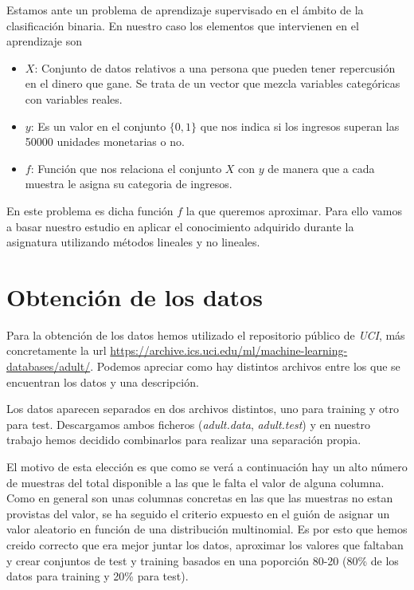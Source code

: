 \documentclass[a4paper,11pt]{article}
\begin{document}
Estamos ante un problema de aprendizaje supervisado en el ámbito de la
clasificación binaria. En nuestro caso los elementos que intervienen en el
aprendizaje son 

\begin{itemize}
    \item $X$: Conjunto de datos relativos a una persona que pueden tener
    repercusión en el dinero que gane. Se trata de un vector que mezcla
    variables categóricas con variables reales.
    \item $y$: Es un valor en el conjunto $\{0,1\}$ que nos indica si los
    ingresos superan las 50000 unidades monetarias o no.
    \item $f$: Función que nos relaciona el conjunto $X$ con $y$ de manera que a
    cada muestra le asigna su categoria de ingresos.
\end{itemize}

En este problema es dicha función $f$ la que queremos aproximar. Para ello vamos
a basar nuestro estudio en aplicar el conocimiento adquirido durante la
asignatura utilizando métodos lineales y no lineales.

\section{Obtención de los datos}

Para la obtención de los datos hemos utilizado el repositorio público de
\textit{UCI}, más concretamente la url
\href{https://archive.ics.uci.edu/ml/machine-learning-databases/adult/}{https://archive.ics.uci.edu/ml/machine-learning-databases/adult/}.
Podemos apreciar como hay distintos archivos entre los que se encuentran los
datos y una descripción. 

Los datos aparecen separados en dos archivos distintos, uno para training y otro
para test. Descargamos ambos ficheros (\textit{adult.data}, \textit{adult.test})
y en nuestro trabajo hemos decidido combinarlos para realizar una separación
propia.

El motivo de esta elección es que como se verá a continuación hay un alto número
de muestras del total disponible a las que le falta el valor de alguna columna.
Como en general son unas columnas concretas en las que las muestras no estan
provistas del valor, se ha seguido el criterio expuesto en el guión de asignar
un valor aleatorio en función de una distribución multinomial. Es por esto que
hemos creido correcto que era mejor juntar los datos, aproximar los valores que
faltaban y crear conjuntos de test y training basados en una poporción 80-20
(80\% de los datos para training y 20\% para test).
\end{document}

